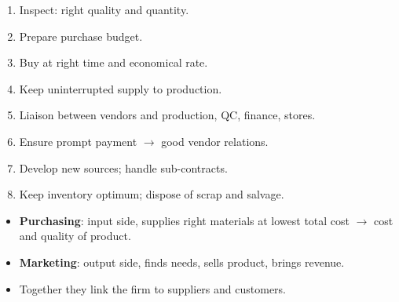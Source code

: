 {\begin{enumerate}
  \item Inspect: right quality and quantity.
  \item Prepare purchase budget.
  \item Buy at right time and economical rate.
  \item Keep uninterrupted supply to production.
  \item Liaison between vendors and production, QC, finance, stores.
  \item Ensure prompt payment $\rightarrow$ good vendor relations.
  \item Develop new sources; handle sub-contracts.
  \item Keep inventory optimum; dispose of scrap and salvage.
\end{enumerate}
\begin{itemize}
  \item \textbf{Purchasing}: input side, supplies right materials at lowest total cost
    $\rightarrow$ cost and quality of product.
  \item \textbf{Marketing}: output side, finds needs, sells product, brings revenue.
  \item Together they link the firm to suppliers and customers.
\end{itemize}}

